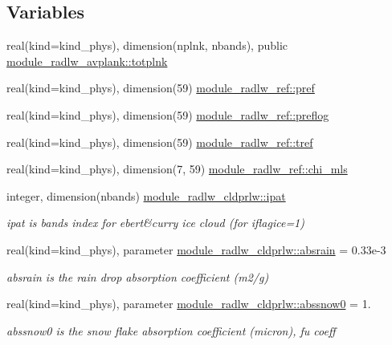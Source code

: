 \subsection*{Variables}
\begin{DoxyCompactItemize}
\item 
real(kind=kind\+\_\+phys), dimension(nplnk, nbands), public \hyperlink{namespacemodule__radlw__avplank_a40c3d6831ec6d7dbdb31254226c8f861}{module\+\_\+radlw\+\_\+avplank\+::totplnk}
\item 
real(kind=kind\+\_\+phys), dimension(59) \hyperlink{namespacemodule__radlw__ref_adda97d9a274bef59507633a3fc5a0e78}{module\+\_\+radlw\+\_\+ref\+::pref}
\item 
real(kind=kind\+\_\+phys), dimension(59) \hyperlink{namespacemodule__radlw__ref_a4206f7320b6f1b59eb0132326263d2e4}{module\+\_\+radlw\+\_\+ref\+::preflog}
\item 
real(kind=kind\+\_\+phys), dimension(59) \hyperlink{namespacemodule__radlw__ref_a56972f3948052e8b7f4717c192fc551d}{module\+\_\+radlw\+\_\+ref\+::tref}
\item 
real(kind=kind\+\_\+phys), dimension(7, 59) \hyperlink{namespacemodule__radlw__ref_adc2bbd1ac0178afda84e74ad45404d31}{module\+\_\+radlw\+\_\+ref\+::chi\+\_\+mls}
\item 
integer, dimension(nbands) \hyperlink{namespacemodule__radlw__cldprlw_a9e8ebd81d5d62c2be4c006a595493aed}{module\+\_\+radlw\+\_\+cldprlw\+::ipat}
\begin{DoxyCompactList}\small\item\em ipat is bands index for ebert\&curry ice cloud (for iflagice=1) \end{DoxyCompactList}\item 
real(kind=kind\+\_\+phys), parameter \hyperlink{namespacemodule__radlw__cldprlw_a04bff194fec27e0586ab1b4770319882}{module\+\_\+radlw\+\_\+cldprlw\+::absrain} = 0.\+33e-\/3
\begin{DoxyCompactList}\small\item\em absrain is the rain drop absorption coefficient (m2/g) \end{DoxyCompactList}\item 
real(kind=kind\+\_\+phys), parameter \hyperlink{namespacemodule__radlw__cldprlw_a4bcd58c6a7e9abdfbb8f8ec7d925d143}{module\+\_\+radlw\+\_\+cldprlw\+::abssnow0} = 1.
\begin{DoxyCompactList}\small\item\em abssnow0 is the snow flake absorption coefficient (micron), fu coeff \end{DoxyCompactList}\item 

\end{DoxyCompactItemize}
